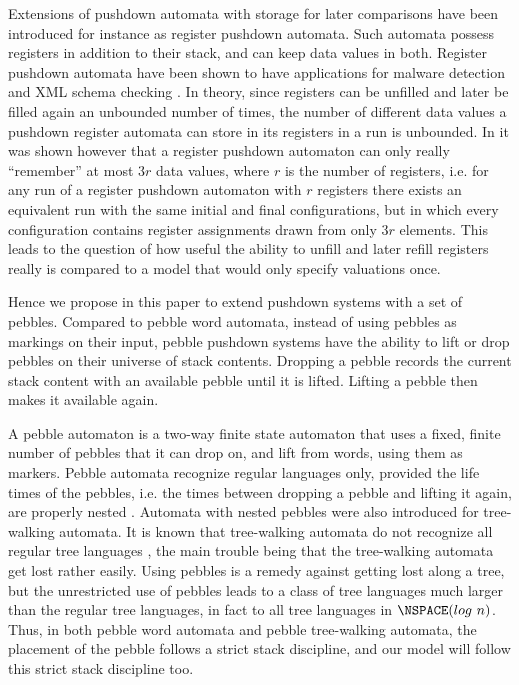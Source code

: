 \documentclass[a4paper,UKenglish,cleveref, autoref, thm-restate]{lipics-v2021}
\begin{document}
Extensions of pushdown automata with storage for later comparisons
have been introduced for instance as register pushdown automata. 
Such automata possess registers in addition to their stack, and can keep data values in both.
Register pushdown automata have been shown to have applications for malware detection and XML schema checking \cite{senda2021forward, senda2021ltl}. 
In theory, since registers can be unfilled and later be filled again an unbounded number of times, the number of different data values a pushdown register automata can store in its registers in a run is unbounded.  
In \cite{murawski2017reachability} it was shown however that a register pushdown automaton can
only really ``remember'' at most  $3r$ data values, where $r$ is the number of registers,
i.e. for any run of a register pushdown automaton with $r$ registers there exists an equivalent run %
 with the same initial and final conﬁgurations, but in which every configuration contains register assignments drawn from only $3r$ elements. This 
 leads to
 the
  question
  of
   how useful the ability to unfill and later refill registers really is compared to a model that would only specify valuations once.



Hence we propose in this paper to extend pushdown systems with a set of pebbles.
Compared to pebble word automata, instead of using pebbles
as markings on their input, pebble pushdown systems have the ability to lift or drop pebbles
on their universe of stack contents. Dropping a pebble records the current stack content with an available pebble until it is lifted. Lifting a pebble then makes it available again.


A pebble automaton is a two-way finite state automaton that uses a fixed, finite number of
pebbles that it can drop on, and lift from 
words, using them as markers.
Pebble automata recognize regular languages only, provided the life times of the pebbles, i.e. the times between dropping a pebble and lifting it again, are properly nested
\cite{globerman1996complexity, engelfriet1999tree}.
Automata with nested pebbles were also introduced
for tree-walking automata. 
It is known that tree-walking automata do not recognize all regular tree languages \cite{bojanczyk2008tree}, the main trouble being that the tree-walking automata get lost rather easily.
Using pebbles is a remedy against getting lost along a tree, but 
the unrestricted use of pebbles leads to a class of tree languages much larger than the
regular tree languages, in fact to all tree languages in $\NSPACE(log ~ n)$.
Thus, in both pebble word automata and pebble tree-walking automata, the placement of the pebble follows a strict stack discipline, and our model will follow this strict stack discipline too.
\end{document}
